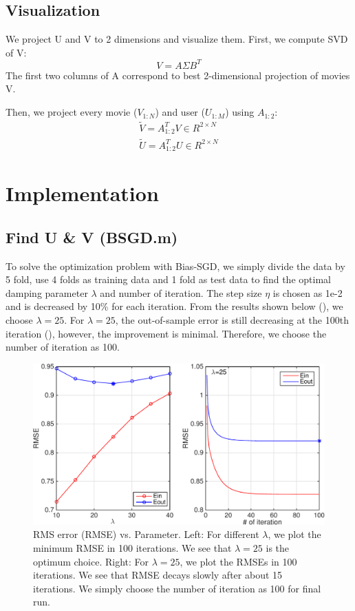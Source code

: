 \documentclass[12pt]{article}
\begin{document}
\subsection{Visualization}
We project U and V to 2 dimensions and visualize them. First, we compute SVD of V:
\begin{equation*}
V=A\Sigma B^{T}
\end{equation*}
The first two columns of A correspond to best 2-dimensional projection of movies V.

Then, we project every movie ($V_{1:N}$) and user ($U_{1:M}$) using $A_{1:2}$:
\begin{eqnarray*}
\tilde{V}=A_{1:2}^{T} V \in R^{2\times N}\\
\tilde{U}=A_{1:2}^{T} U \in R^{2\times N}
\end{eqnarray*}

\section{Implementation}
\subsection{Find U \& V (BSGD.m)}
To solve the optimization problem with Bias-SGD, we simply divide the data by 5 fold, use 4 folds as training data and 1 fold as test data to find the optimal damping parameter $\lambda$  and number of iteration. The step size $\eta$ is chosen as 1e-2 and is decreased by 10\% for each iteration. From the results shown below (), we choose $\lambda=25$. For $\lambda=25$, the out-of-sample error is still decreasing at the 100th iteration (), however, the improvement is minimal. Therefore, we choose the number of iteration as 100.

\begin{figure}[h!]
  \centering
      \includegraphics[width=1.0\textwidth]{testparameter-crop.pdf}
  \caption{RMS error (RMSE) vs. Parameter. Left: For different $\lambda$, we plot the minimum RMSE in 100 iterations. We see that $\lambda=25$ is the optimum choice. Right: For $\lambda=25$, we plot the RMSEs in 100 iterations. We see that RMSE decays slowly after about 15 iterations. We simply choose the number of iteration as 100 for final run.}
  \label{fig:test}
\end{figure}
\end{document}
